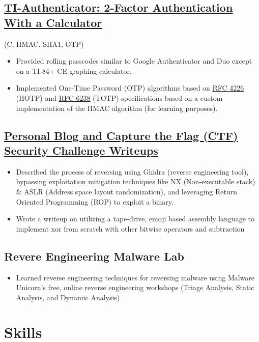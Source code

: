 \documentclass{article}
\begin{document}
\subsection{\href{https://youtu.be/DLzxrzFCyOs}{\underline{TI-Authenticator: 2-Factor Authentication With a Calculator}}} \hfill (C, HMAC, SHA1, OTP)
\begin{itemize}
    \item Provided rolling passcodes similar to Google Authenticator and Duo except on a TI-84+ CE graphing calculator.
    \item Implemented One-Time Password (OTP) algorithms based on \href{https://tools.ietf.org/html/rfc4226}{\underline{RFC 4226}} (HOTP) and \href{https://tools.ietf.org/html/rfc6238}{\underline{RFC 6238}} (TOTP) specifications based on a custom implementation of the HMAC algorithm (for learning purposes).
\end{itemize}

\subsection{\href{https://youtu.be/DLzxrzFCyOs}{ \underline{Personal Blog and Capture the Flag (CTF) Security Challenge Writeups}}}
\begin{itemize}
    \item Described the process of reversing using Ghidra (reverse engineering tool), bypassing exploitation mitigation techniques like NX (Non-executable stack) \& ASLR (Address space layout randomization), and leveraging Return Oriented Programming (ROP) to exploit a binary.
    \item Wrote a writeup on utilizing a tape-drive, emoji based assembly language to implement xor from scratch with other bitwise operators and subtraction
\end{itemize}

\subsection{Revere Engineering Malware Lab}
\begin{itemize}
    \item Learned reverse engineering techniques for reversing malware using Malware Unicorn's free, online reverse engineering workshops (Triage Analysis, Static Analysis, and Dynamic Analysis)
\end{itemize}

\section{Skills}
\end{document}
